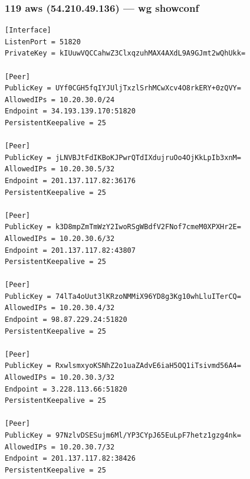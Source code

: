 \documentclass[11pt,a4paper]{article}
\begin{document}
\subsubsection*{119 aws (54.210.49.136) — wg showconf}
\begin{lstlisting}
[Interface]
ListenPort = 51820
PrivateKey = kIUuwVQCCahwZ3ClxqzuhMAX4AXdL9A9GJmt2wQhUkk=

[Peer]
PublicKey = UYf0CGH5fqIYJUljTxzlSrhMCwXcv4O8rkERY+0zQVY=
AllowedIPs = 10.20.30.0/24
Endpoint = 34.193.139.170:51820
PersistentKeepalive = 25

[Peer]
PublicKey = jLNVBJtFdIKBoKJPwrQTdIXdujruOo4OjKkLpIb3xnM=
AllowedIPs = 10.20.30.5/32
Endpoint = 201.137.117.82:36176
PersistentKeepalive = 25

[Peer]
PublicKey = k3D8mpZmTmWzY2IwoRSgWBdfV2FNof7cmeM0XPXHr2E=
AllowedIPs = 10.20.30.6/32
Endpoint = 201.137.117.82:43807
PersistentKeepalive = 25

[Peer]
PublicKey = 74lTa4oUut3lKRzoNMMiX96YD8g3Kg10whLluITerCQ=
AllowedIPs = 10.20.30.4/32
Endpoint = 98.87.229.24:51820
PersistentKeepalive = 25

[Peer]
PublicKey = RxwlsmxyoKSNhZ2o1uaZAdvE6iaH5OQ1iTsivmd56A4=
AllowedIPs = 10.20.30.3/32
Endpoint = 3.228.113.66:51820
PersistentKeepalive = 25

[Peer]
PublicKey = 97NzlvDSESujm6Ml/YP3CYpJ65EuLpF7hetz1gzg4nk=
AllowedIPs = 10.20.30.7/32
Endpoint = 201.137.117.82:38426
PersistentKeepalive = 25

\end{lstlisting}
\end{document}
